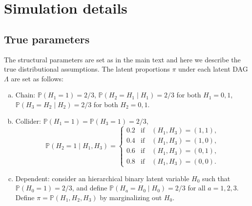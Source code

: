 \documentclass[10pt]{article} %
\newcommand{\PP}{\mathbb P}
\begin{document}
\section{Simulation details}\label{sec:simulation details}
\subsection{True parameters}\label{subsec:true param} The structural parameters are set as in the main text and here we describe the true distributional assumptions. The latent proportions $\pi$ under each latent DAG $\Lambda$ are set as follows: 
\begin{enumerate}[(a)]
    \item Chain: $\PP(H_1 = 1) = 2/3$, $\PP(H_2 = H_1 \mid H_1) = 2/3$ for both $H_1 = 0, 1$, $\PP(H_3 = H_2 \mid H_2) = 2/3$ for both $H_2 = 0, 1$.
    \item Collider: $\PP(H_1 = 1) = \PP(H_3 = 1) = 2/3$, $$\PP(H_2 = 1 \mid H_1, H_3) = \begin{cases}
        0.2 & \text{if} \quad (H_1,H_3) = (1,1), \\
        0.4 & \text{if} \quad (H_1,H_3) = (1,0), \\
        0.6 & \text{if} \quad (H_1,H_3) = (0,1), \\
        0.8 & \text{if} \quad (H_1,H_3) = (0,0).
    \end{cases}$$
    \item Dependent: consider an hierarchical binary latent variable $H_0$ such that $\PP(H_0=1)=2/3$, and define $\PP(H_a = H_0 \mid H_0) = 2/3$ for all $a=1,2,3$. Define $\pi = \PP(H_1, H_2, H_3)$ by marginalizing out $H_0$.
\end{enumerate}
\end{document}
